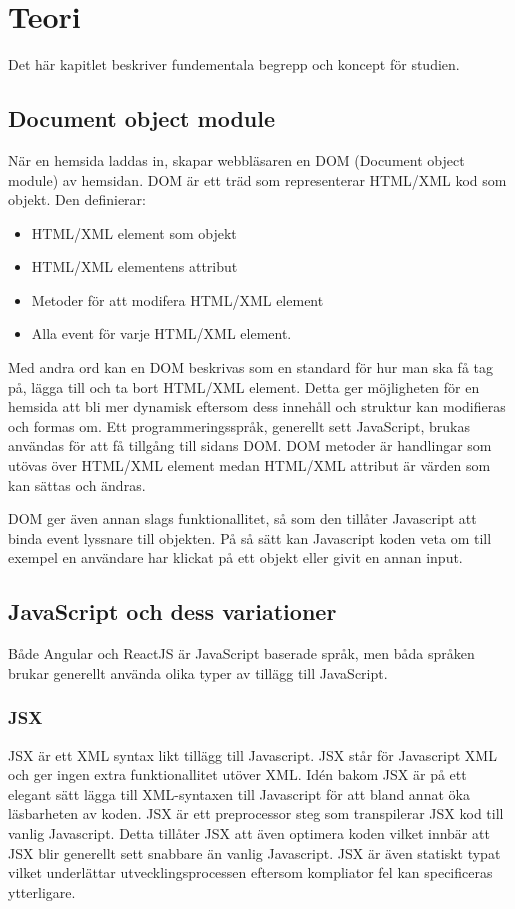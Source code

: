 \section{Teori}
\label{sec:axel-theory}
Det här kapitlet beskriver fundementala begrepp och koncept för studien.

\subsection{Document object module}
När en hemsida laddas in, skapar webbläsaren en DOM (Document object module) av hemsidan. DOM är ett träd som representerar HTML/XML kod som objekt. \cite{w3-htmldom} Den definierar:

\begin{itemize}
\item HTML/XML element som objekt
\item HTML/XML elementens attribut
\item Metoder för att modifera HTML/XML element
\item Alla event för varje HTML/XML element.
\end{itemize} 

Med andra ord kan en DOM beskrivas som en standard för hur man ska få tag på, lägga till och ta bort HTML/XML element. Detta ger möjligheten för en hemsida att bli mer dynamisk eftersom dess innehåll och struktur kan modifieras och formas om. Ett programmeringsspråk, generellt sett JavaScript, brukas användas för att få tillgång till sidans DOM. DOM metoder är handlingar som utövas över HTML/XML element medan HTML/XML attribut är värden som kan sättas och ändras.

DOM ger även annan slags funktionallitet, så som den tillåter Javascript att binda event lyssnare till objekten.\cite{w3-event} På så sätt kan Javascript koden veta om till exempel en användare har klickat på ett objekt eller givit en annan input.


\subsection{JavaScript och dess variationer}
Både Angular och ReactJS är JavaScript baserade språk, men båda språken brukar generellt använda olika typer av tillägg till JavaScript.

\subsubsection{JSX}
JSX är ett XML syntax likt tillägg till Javascript. JSX står för Javascript XML och ger ingen extra funktionallitet utöver XML. Idén bakom JSX är på ett elegant sätt lägga till XML-syntaxen till Javascript för att bland annat öka läsbarheten av koden.\cite{react-jsx} JSX är ett preprocessor steg som transpilerar JSX kod till vanlig Javascript. Detta tillåter JSX att även optimera koden vilket innbär att JSX blir generellt sett snabbare än vanlig Javascript.\cite{jsx} \cite{facebook-jsx} JSX är även statiskt typat vilket underlättar utvecklingsprocessen eftersom kompliator fel kan specificeras ytterligare. 

